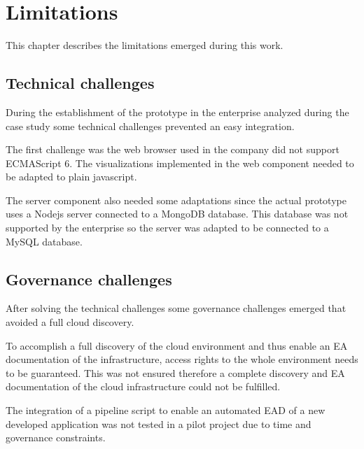 
\chapter{Limitations}\label{chapter:conclusion}

This chapter describes the limitations emerged during this work.

\section{Technical challenges}
During the establishment of the prototype in the enterprise analyzed during the case study some technical challenges prevented an easy integration.

The first challenge was the web browser used in the company did not support ECMAScript 6. The visualizations implemented in the web component needed to be adapted to plain javascript.

The server component also needed some adaptations since the actual prototype uses a Nodejs server connected to a MongoDB database. This database was not supported by the enterprise so the server was adapted to be connected to a MySQL database. 

\section{Governance challenges}
After solving the technical challenges some governance challenges emerged that avoided a full cloud discovery. 

To accomplish a full discovery of the cloud environment and thus enable an EA documentation of the infrastructure, access rights to the whole environment needs to be guaranteed. This was not ensured therefore a complete discovery and EA documentation of the cloud infrastructure could not be fulfilled.

The integration of a pipeline script to enable an automated EAD of a new developed application was not tested in a pilot project due to time and governance constraints.
